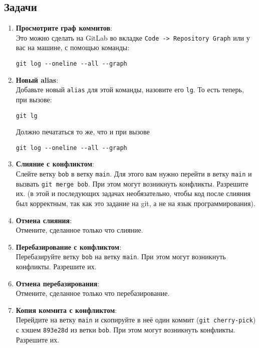 \documentclass{article}
\begin{document}
\subsection*{Задачи}
\begin{enumerate}
\item \textbf{Просмотрите граф коммитов}:\\
Это можно сделать на GitLab во вкладке \texttt{Code -> Repository Graph} или у вас на машине, с помощью команды:
\begin{lstlisting}
git log --oneline --all --graph
\end{lstlisting}

\item \textbf{Новый alias}:\\
Добавьте новый \texttt{alias} для этой команды, назовите его \texttt{lg}. То есть теперь, при вызове: 
\begin{lstlisting}
git lg
\end{lstlisting}
Должно печататься то же, что и при вызове 
\begin{lstlisting}
git log --oneline --all --graph
\end{lstlisting}



\item \textbf{Слияние с конфликтом}:\\
Слейте ветку \texttt{bob} в ветку \texttt{main}. Для этого вам нужно перейти в ветку \texttt{main} и вызвать \texttt{git merge bob}. При этом могут возникнуть конфликты. Разрешите их. (в этой и последующих задачах необязательно, чтобы код после слияния был корректным, так как это задание на git, а не на язык программирования).

\item \textbf{Отмена слияния}:\\
Отмените, сделанное только что слияние.

\item \textbf{Перебазирование с конфликтом}:\\
Перебазируйте ветку \texttt{bob} на ветку \texttt{main}. При этом могут возникнуть конфликты. Разрешите их.

\item \textbf{Отмена перебазирования}:\\
Отмените, сделанное только что перебазирование.

\item \textbf{Копия коммита с конфликтом}:\\
Перейдите на ветку \texttt{main} и скопируйте в неё один коммит (\texttt{git cherry-pick}) с хэшем \texttt{893e28d} из ветки \texttt{bob}. При этом могут возникнуть конфликты. Разрешите их.


\end{enumerate}
\end{document}
